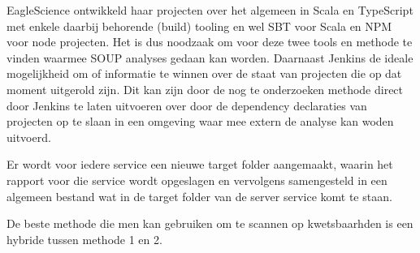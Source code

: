 EagleScience ontwikkeld haar projecten over het algemeen in Scala en TypeScript met enkele daarbij behorende (build) tooling en wel SBT voor Scala en NPM voor node projecten. Het is dus noodzaak om voor deze twee tools en methode te vinden waarmee SOUP analyses gedaan kan worden. Daarnaast Jenkins de ideale mogelijkheid om of informatie te winnen over de staat van projecten die op dat moment uitgerold zijn. Dit kan zijn door de nog te onderzoeken methode direct door Jenkins te laten uitvoeren over door de dependency declaraties van projecten op te slaan in een omgeving waar mee extern de analyse kan woden uitvoerd.


Er wordt voor iedere service een nieuwe target folder aangemaakt, waarin het rapport voor die service wordt opgeslagen en vervolgens samengesteld in een algemeen bestand wat in de target folder van de server service komt te staan.


De beste methode die men kan gebruiken om te scannen op kwetsbaarhden is een hybride tussen methode 1 en 2.
